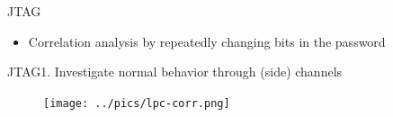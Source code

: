 \documentclass[table]{beamer}
\begin{document}
\begin{frame}{JTAG}
    \begin{itemize}
        \item Correlation analysis by repeatedly changing bits in the password
    \end{itemize}
\end{frame}






\begin{frame}{JTAG}{1. Investigate normal behavior through (side) channels }
    \begin{figure}[H]
      \centering
      \texttt{[image: ../pics/lpc-corr.png]}
    \end{figure}
\end{frame}
\end{document}
